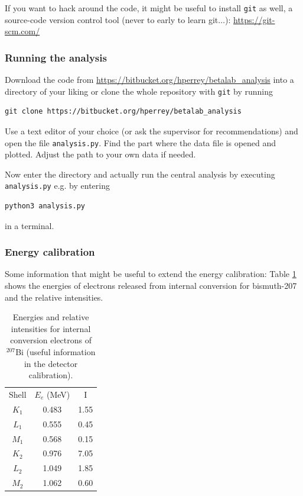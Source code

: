 \documentclass[a4,11pt, notitlepage]{article}
\begin{document}
If you want to hack around the code, it might be useful to install
\texttt{git} as well, a source-code version control tool (never to
early to learn git$\ldots$): \url{https://git-scm.com/}

\subsubsection{Running the analysis}
\label{sec:running-analysis}

Download the code from
\url{https://bitbucket.org/hperrey/betalab_analysis} into a directory
of your liking or clone the whole repository with \texttt{git} by running
\begin{verbatim}
git clone https://bitbucket.org/hperrey/betalab_analysis
\end{verbatim}

Use a text editor of your choice (or ask the supervisor for
recommendations) and open the file \texttt{analysis.py}. Find the part
where the data file is opened and plotted. Adjust the path to your own
data if needed.

Now enter the directory and actually run the central analysis by executing \texttt{analysis.py} e.g. by
entering
\begin{verbatim}
python3 analysis.py
\end{verbatim}
in a terminal.

\subsubsection{Energy calibration}
\label{sec:energy-calib}

Some information that might be useful to extend the energy
calibration: Table \ref{tab:calib} shows the energies of electrons released from
internal conversion for bismuth-207 and the relative intensities.

\begin{table}[h]
\caption{Energies and relative intensities for internal conversion
  electrons of $^{207}$Bi (useful information in the detector calibration).}
\label{tab:calib}
\centering
\begin{tabular}{ccc}
Shell & $E_{e}$ (MeV) & I \\
$K_1$ & 0.483 & 1.55 \\
$L_1$ & 0.555 & 0.45 \\
$M_1$ & 0.568 & 0.15 \\
$K_2$ & 0.976 & 7.05 \\
$L_2$ & 1.049 & 1.85 \\
$M_2$ & 1.062 & 0.60 
\end{tabular}
\end{table}
\end{document}
